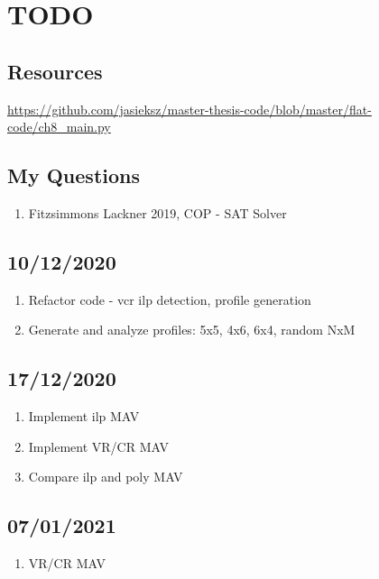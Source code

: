 
\chapter{TODO}

\section{Resources}
\url{https://github.com/jasieksz/master-thesis-code/blob/master/flat-code/ch8_main.py}

\section{My Questions}

\begin{enumerate}
    \item Fitzsimmons Lackner 2019, COP - SAT Solver
\end{enumerate}

\newpage

\section{10/12/2020}
\begin{enumerate}
    \item Refactor code - vcr ilp detection, profile generation
    \item Generate and analyze profiles: 5x5, 4x6, 6x4, random NxM
\end{enumerate}

\section{17/12/2020}
\begin{enumerate}
    \item Implement ilp MAV
    \item Implement VR/CR MAV \cite{mav}
    \item Compare ilp and poly MAV
\end{enumerate}

\section{07/01/2021}
\begin{enumerate}
    \item VR/CR MAV \cite{mav}
\end{enumerate}

